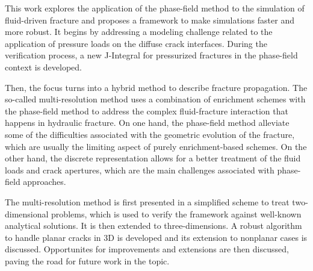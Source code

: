 \abstract

This work explores the application of the phase-field method to the simulation of fluid-driven fracture and proposes a framework to make simulations faster and more robust. It begins by addressing a modeling challenge related to the application of pressure loads on the diffuse crack interfaces. During the verification process, a new J-Integral for pressurized fractures in the phase-field context is developed.

Then, the focus turns into a hybrid method to describe fracture propagation. The so-called multi-resolution method uses a combination of enrichment schemes with the phase-field method to address the complex fluid-fracture interaction that happens in hydraulic fracture. On one hand, the phase-field method alleviate some of the difficulties associated with the geometric evolution of the fracture, which are usually the limiting aspect of purely enrichment-based schemes. On the other hand, the discrete representation allows for a better treatment of the fluid loads and crack apertures, which are the main challenges associated with phase-field approaches. 

The multi-resolution method is first presented in a simplified scheme to treat two-dimensional problems, which is used to verify the framework against well-known analytical solutions. It is then extended to three-dimensions. A robust algorithm to handle planar cracks in 3D is developed and its extension to nonplanar cases is discussed. Opportunites for improvements and extensions are then discussed, paving the road for future work in the topic.


